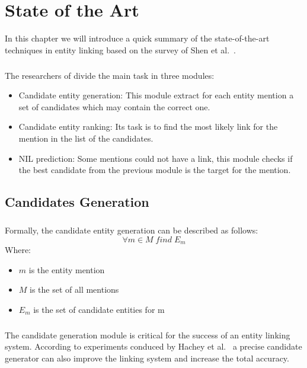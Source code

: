 \chapter{State of the Art}
In this chapter we will introduce a quick summary of the state-of-the-art techniques in entity linking based on the survey of Shen et al.~\cite{shen2015entity}.
\paragraph{}
The researchers of \cite{shen2015entity} divide the main task in three modules:
\begin{itemize}
\item Candidate entity generation: This module extract for each entity mention a set of candidates which may contain the correct one.
\item Candidate entity ranking: Its task is to find the most likely link for the mention in the list of the candidates.
\item NIL prediction: Some mentions could not have a link, this module checks if the best candidate from the previous module is the target for the mention. 
\end{itemize}

\section{Candidates Generation}
\paragraph{}
Formally, the candidate entity generation can be described as follows:
\[\forall m \in M \; find \; E_m\]
Where:

\begin{itemize}[noitemsep,  topsep=10pt]
\item $m$ is the entity mention
\item $M$ is the set of all mentions
\item $E_m$ is the set of candidate entities for m
\end{itemize}
\pagebreak
\paragraph{} The candidate generation module is critical for the success of an entity linking system. According to experiments conduced by Hachey et al.~\cite{hachey2013evaluating} a precise candidate generator can also improve the linking system and increase the total accuracy.

